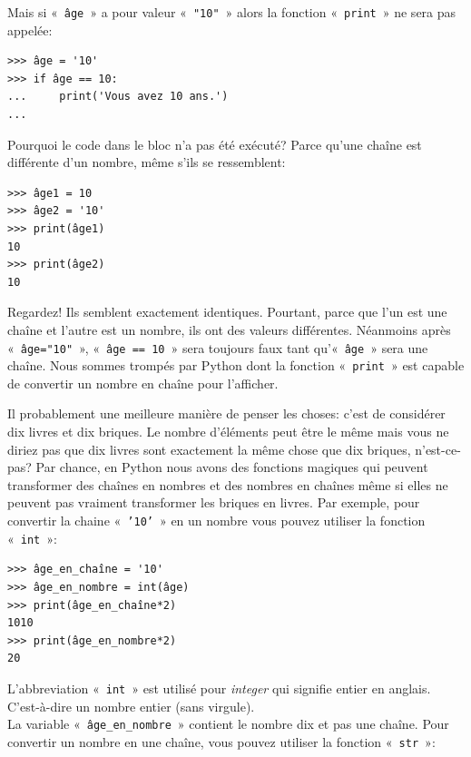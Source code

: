 Mais si «~\texttt{âge}~»  a pour valeur «~\texttt{"10"}~» alors la fonction «~\texttt{print}~» ne sera pas appelée:

\begin{Verbatim}[frame=single,rulecolor=\color{green}, label=à taper avec attention]
>>> âge = '10'
>>> if âge == 10:
...     print('Vous avez 10 ans.')
...
\end{Verbatim}

Pourquoi le code dans le bloc n'a pas été exécuté? Parce qu'une chaîne est différente d'un nombre, même s'ils se ressemblent:

\begin{Verbatim}[frame=single,rulecolor=\color{mbleu}, label=à taper]
>>> âge1 = 10
>>> âge2 = '10'
>>> print(âge1)
10
>>> print(âge2)
10
\end{Verbatim}

Regardez! Ils semblent exactement identiques. Pourtant, parce que l'un est une chaîne et l'autre est un nombre, ils ont des valeurs différentes. Néanmoins après «~\texttt{âge="10"}~», «~\texttt{âge == 10}~»  sera toujours faux tant qu'«~\texttt{âge}~» sera une chaîne.  Nous sommes trompés par Python dont la fonction «~\texttt{print}~» est capable de convertir un nombre en chaîne pour l'afficher.

Il probablement une meilleure manière de penser les choses: c'est de considérer dix livres et dix briques. Le nombre d'éléments peut être le même mais vous ne diriez pas que dix livres sont exactement la même chose que dix briques, n'est-ce-pas? Par chance, en Python nous avons des fonctions magiques qui peuvent transformer des chaînes en nombres et des nombres en chaînes même si elles ne peuvent pas vraiment transformer les briques en livres. Par exemple, pour convertir la chaine «~\texttt{'10'}~»  en un nombre vous pouvez utiliser la fonction «~\texttt{int}~»: 

\begin{Verbatim}[frame=single,rulecolor=\color{mbleu}, label=à taper]
>>> âge_en_chaîne = '10'
>>> âge_en_nombre = int(âge)
>>> print(âge_en_chaîne*2)
1010
>>> print(âge_en_nombre*2)
20
\end{Verbatim}

L'abbreviation «~\texttt{int}~»  est utilisé  pour \emph{integer} qui signifie entier en anglais. C'est-à-dire un nombre entier (sans virgule).\\

La variable «~\texttt{âge\_en\_nombre}~» contient le nombre dix et pas une chaîne. Pour convertir un nombre en une chaîne, vous pouvez utiliser la fonction «~\texttt{str}~»:


